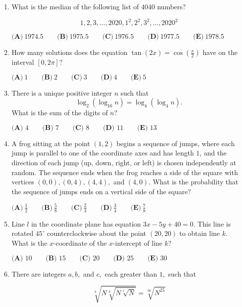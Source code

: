 \documentclass{article}%
\begin{document}
\begin{enumerate}
%
\item%
[\textbf{Problem 8}]What is the median of the following list of $4040$ numbers$?$

\[1, 2, 3, ..., 2020, 1^2, 2^2, 3^2, ..., 2020^2\]

$\textbf{(A)}\ 1974.5\qquad\textbf{(B)}\ 1975.5\qquad\textbf{(C)}\ 1976.5\qquad\textbf{(D)}\ 1977.5\qquad\textbf{(E)}\ 1978.5$

%
\item%
[\textbf{Problem 9}]How many solutions does the equation $\tan(2x)=\cos(\frac{x}{2})$ have on the interval $[0,2\pi]?$

$\textbf{(A)}\ 1\qquad\textbf{(B)}\ 2\qquad\textbf{(C)}\ 3\qquad\textbf{(D)}\ 4\qquad\textbf{(E)}\ 5$

%
\item%
[\textbf{Problem 10}]There is a unique positive integer $n$ such that\[\log_2{(\log_{16}{n})} = \log_4{(\log_4{n})}.\]What is the sum of the digits of $n?$

$\textbf{(A) } 4 \qquad \textbf{(B) } 7 \qquad \textbf{(C) } 8 \qquad \textbf{(D) } 11 \qquad \textbf{(E) } 13$

%
\item%
[\textbf{Problem 11}]A frog sitting at the point $(1, 2)$ begins a sequence of jumps, where each jump is parallel to one of the coordinate axes and has length $1$, and the direction of each jump (up, down, right, or left) is chosen independently at random. The sequence ends when the frog reaches a side of the square with vertices $(0,0), (0,4), (4,4),$ and $(4,0)$. What is the probability that the sequence of jumps ends on a vertical side of the square$?$

$\textbf{(A)}\ \frac12\qquad\textbf{(B)}\ \frac 58\qquad\textbf{(C)}\ \frac 23\qquad\textbf{(D)}\ \frac34\qquad\textbf{(E)}\ \frac 78$

%
\item%
[\textbf{Problem 12}]Line $l$ in the coordinate plane has equation $3x-5y+40=0$. This line is rotated $45^{\circ}$ counterclockwise about the point $(20,20)$ to obtain line $k$. What is the $x$-coordinate of the $x$-intercept of line $k?$

$\textbf{(A) } 10 \qquad \textbf{(B) } 15 \qquad \textbf{(C) } 20 \qquad \textbf{(D) } 25 \qquad \textbf{(E) } 30$

%
\item%
[\textbf{Problem 13}]There are integers $a, b,$ and $c,$ each greater than $1,$ such that

\[\sqrt[a]{N\sqrt[b]{N\sqrt[c]{N}}} = \sqrt[36]{N^{25}}\]


\end{enumerate}
\end{document}
